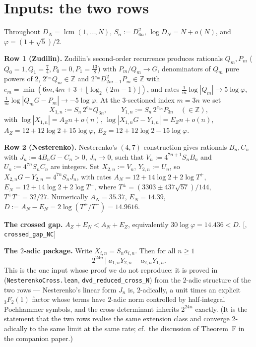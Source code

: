 \documentclass[11pt]{amsart}
\theoremstyle{remark}
\newcommand{\Z}{\mathbb Z}\newcommand{\Q}{\mathbb Q}\newcommand{\R}{\mathbb R}
\begin{document}
\section{Inputs: the two rows}
Throughout $D_N=\operatorname{lcm}(1,\dots,N)$, $S_n:=D_{6n}^2$, $\log D_N=N+o(N)$, and $\varphi=(1+\sqrt5)/2$.

\textbf{Row 1 (Zudilin).} Zudilin's second-order recurrence \cite{Zud} produces rationals $Q_m,P_m$ ($Q_0=1,Q_1=\tfrac74,P_0=0,P_1=\tfrac{13}8$) with $P_m/Q_m\to G$, denominators of $Q_m$ pure powers of $2$, $2^{e_m}Q_m\in\Z$ and $2^{e_m}D_{2m-1}^2P_m\in\Z$ with $e_m=\min(6m,4m+3+\lfloor\log_2(2m-1)\rfloor)$, and rates $\tfrac1m\log|Q_m|\to5\log\varphi$, $\tfrac1m\log|Q_mG-P_m|\to-5\log\varphi$. At the $3$-sectioned index $m=3n$ we set
\[X_{1,n}:=S_n\,2^{e_{3n}}Q_{3n},\qquad Y_{1,n}:=S_n\,2^{e_{3n}}P_{3n}\quad(\in\Z),\]
with $\log|X_{1,n}|=A_Zn+o(n)$, $\log|X_{1,n}G-Y_{1,n}|=E_Zn+o(n)$, $A_Z=12+12\log2+15\log\varphi$, $E_Z=12+12\log2-15\log\varphi$.

\textbf{Row 2 (Nesterenko).} Nesterenko's $(4,7)$ construction \cite{Nes} gives rationals $B_n,C_n$ with $J_n:=4B_nG-C_n>0$, $J_n\to0$, such that $V_n:=4^{7n+1}S_nB_n$ and $U_n:=4^{7n}S_nC_n$ are integers. Set $X_{2,n}:=V_n$, $Y_{2,n}:=U_n$, so $X_{2,n}G-Y_{2,n}=4^{7n}S_nJ_n$, with rates $A_N=12+14\log2+2\log T^+$, $E_N=12+14\log2+2\log T^-$, where $T^\pm=(3303\pm437\sqrt{57})/144$, $T^+T^-=32/27$. Numerically $A_N=35.37$, $E_N=14.39$, $D:=A_N-E_N=2\log(T^+/T^-)=14.9616$.

\textbf{The crossed gap.} $A_Z+E_N<A_N+E_Z$, equivalently $30\log\varphi=14.436<D$. \hfill[\cite{Lean}, \texttt{crossed\_gap\_NC}]

\textbf{The $2$-adic package.} Write $X_{i,n}=S_na_{i,n}$. Then for all $n\ge1$
\begin{equation}\label{cross}
2^{24n}\ \big|\ a_{1,n}Y_{2,n}-a_{2,n}Y_{1,n}.
\end{equation}
This is the one input whose proof we do not reproduce: it is proved in \cite{Lean} (\texttt{NesterenkoCross.lean}, \texttt{dvd\_reduced\_cross\_N}) from the $2$-adic structure of the two rows --- Nesterenko's linear form $J_n$ is, $2$-adically, a unit times an explicit ${}_3F_2(1)$ factor whose terms have $2$-adic norm controlled by half-integral Pochhammer symbols, and the cross determinant inherits $2^{24n}$ exactly. (It is the statement that the two rows realise the same extension class and converge $2$-adically to the same limit at the same rate; cf.\ the discussion of Theorem~F in the companion paper.)
\end{document}

